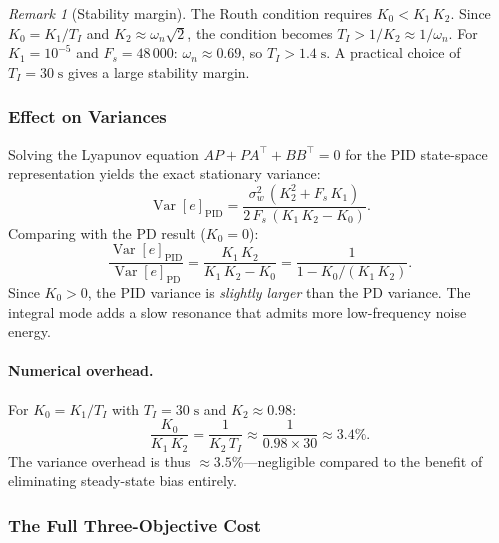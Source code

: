 \documentclass[11pt, a4paper]{article}
\theoremstyle{definition}
\theoremstyle{plain}
\theoremstyle{remark}
\newtheorem{remark}{Remark}[section]
\newcommand{\Var}{\operatorname{Var}}
\begin{document}
\begin{remark}[Stability margin]
  The Routh condition requires $K_0 < K_1\,K_2$.  Since
  $K_0 = K_1/T_I$ and $K_2 \approx \omega_n\sqrt{2}$, the
  condition becomes $T_I > 1/K_2 \approx 1/\omega_n$.  For
  $K_1 = 10^{-5}$ and $F_s = 48\,000$: $\omega_n \approx 0.69$,
  so $T_I > 1.4\;\text{s}$.  A practical choice of
  $T_I = 30\;\text{s}$ gives a large stability margin.
\end{remark}

\subsubsection{Effect on Variances}

Solving the Lyapunov equation $AP + PA^\top + BB^\top = 0$ for the
PID state-space representation yields the exact stationary variance:
\begin{equation}\label{eq:pid-var-e}
  \Var[e]_{\text{PID}}
    = \frac{\sigma_w^2\,(K_2^2 + F_s\,K_1)}
           {2\,F_s\,(K_1\,K_2 - K_0)}.
\end{equation}
Comparing with the PD result ($K_0 = 0$):
\begin{equation}\label{eq:pid-var-ratio}
  \frac{\Var[e]_{\text{PID}}}{\Var[e]_{\text{PD}}}
    = \frac{K_1\,K_2}{K_1\,K_2 - K_0}
    = \frac{1}{1 - K_0/(K_1\,K_2)}.
\end{equation}
Since $K_0 > 0$, the PID variance is \emph{slightly larger} than
the PD variance.  The integral mode adds a slow resonance that
admits more low-frequency noise energy.

\paragraph{Numerical overhead.}
For $K_0 = K_1/T_I$ with $T_I = 30\;\text{s}$ and
$K_2 \approx 0.98$:
\begin{equation}
  \frac{K_0}{K_1\,K_2} = \frac{1}{K_2\,T_I}
    \approx \frac{1}{0.98 \times 30} \approx 3.4\%.
\end{equation}
The variance overhead is thus $\approx 3.5\%$---negligible
compared to the benefit of eliminating steady-state bias entirely.

\subsubsection{The Full Three-Objective Cost}
\end{document}
